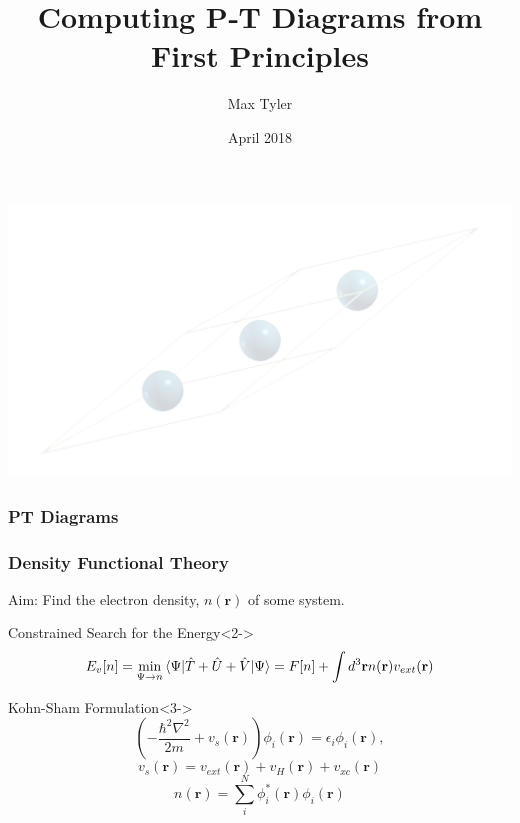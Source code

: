 \documentclass{beamer}
\title{Computing P‐T Diagrams from First Principles}
\author{Max Tyler}
\institute{The University of Edinburgh}
\date{April 2018}
\begin{document}
{ 
\usebackgroundtemplate
{
	\includegraphics[width=\paperwidth,height=\paperheight]{na9rlarge.png}
}
\frame{\titlepage}
}
 
\begin{frame}
	\frametitle{PT Diagrams}
\end{frame}

\begin{frame}
	\frametitle{Density Functional Theory}
	Aim: Find the electron density, $n(\mathbf r)$ of some system.
	\begin{block}{Constrained Search for the Energy}<2->
		$$E_{v}[n] = \min_{\Psi \rightarrow n} \braket{\Psi|\hat T+\hat U + \hat V|\Psi} = F[n] + \int d^3\mathbf r n(\mathbf r) v_{ext}(\mathbf r)$$
	\end{block}
	\begin{block}{Kohn-Sham Formulation}<3->
		$$\left(-\frac{\hbar^2\nabla^2}{2m}+v_s(\mathbf r)\right)\phi_i(\mathbf r) = \epsilon_i \phi_i(\mathbf r),$$
		$$v_s(\mathbf r) = v_{ext}(\mathbf r) + v_H(\mathbf r) + v_{xc}(\mathbf r)$$
		$$n(\mathbf r) = \sum_i^N\phi^*_i(\mathbf r)\phi_i(\mathbf r)$$	
	\end{block}
\end{frame}
\end{document}
